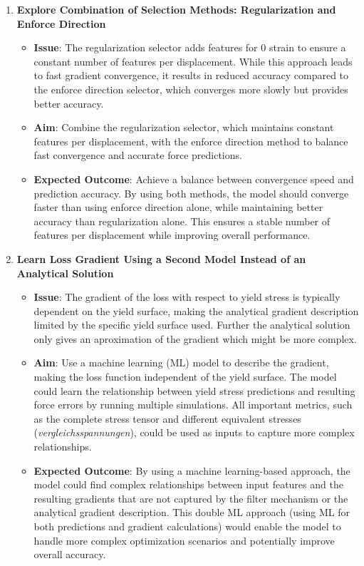 \begin{enumerate}
    \item \textbf{Explore Combination of Selection Methods: Regularization and Enforce Direction}
    \begin{itemize}
        \item \textbf{Issue}: The regularization selector adds features for 0 strain to ensure a constant number of features per displacement. While this approach leads to fast gradient convergence, it results in reduced accuracy compared to the enforce direction selector, which converges more slowly but provides better accuracy.
        \item \textbf{Aim}: Combine the regularization selector, which maintains constant features per displacement, with the enforce direction method to balance fast convergence and accurate force predictions.
        \item \textbf{Expected Outcome}: Achieve a balance between convergence speed and prediction accuracy. By using both methods, the model should converge faster than using enforce direction alone, while maintaining better accuracy than regularization alone. This ensures a stable number of features per displacement while improving overall performance.
    \end{itemize}

    \item \textbf{Learn Loss Gradient Using a Second Model Instead of an Analytical Solution}
    \begin{itemize}
        \item \textbf{Issue}: The gradient of the loss with respect to yield stress is typically dependent on the yield surface, making the analytical gradient description limited by the specific yield surface used. Further the analytical solution only gives an aproximation of the gradient which might be more complex.
        
        \item \textbf{Aim}: Use a machine learning (ML) model to describe the gradient, making the loss function independent of the yield surface. The model could learn the relationship between yield stress predictions and resulting force errors by running multiple simulations. All important metrics, such as the complete stress tensor and different equivalent stresses (\textit{vergleichsspannungen}), could be used as inputs to capture more complex relationships.
        \item \textbf{Expected Outcome}: By using a machine learning-based approach, the model could find complex relationships between input features and the resulting gradients that are not captured by the filter mechanism or the analytical gradient description. This double ML approach (using ML for both predictions and gradient calculations) would enable the model to handle more complex optimization scenarios and potentially improve overall accuracy.
    \end{itemize}
\end{enumerate}